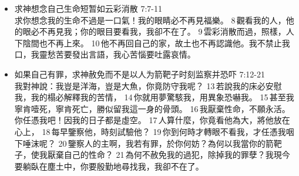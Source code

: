 \begin{itemize}
\begin{itemize}
\item 求神想念自己生命短暂如云彩消散 7:7-11\\
求你想念我的生命不過是一口氣！我的眼睛必不再見福樂。 8 觀看我的人，他的眼必不再見我；你的眼目要看我，我卻不在了。 9 雲彩消散而過，照樣，人下陰間也不再上來。 10 他不再回自己的家，故土也不再認識他。我不禁止我口，我靈愁苦要發出言語，我心苦惱要吐露哀情。
\item 如果自己有罪，求神赦免而不是以人为箭靶子时刻监察并恐吓 7:12-21\\
我對神說：我豈是洋海，豈是大魚，你竟防守我呢？ 13 若說我的床必安慰我，我的榻必解釋我的苦情， 14 你就用夢驚駭我，用異象恐嚇我。 15 甚至我寧肯噎死，寧肯死亡，勝似留我這一身的骨頭。 16 我厭棄性命，不願永活。你任憑我吧！因我的日子都是虛空。 17 人算什麼，你竟看他為大，將他放在心上， 18 每早鑒察他，時刻試驗他？ 19 你到何時才轉眼不看我，才任憑我咽下唾沫呢？ 20 鑒察人的主啊，我若有罪，於你何妨？為何以我當你的箭靶子，使我厭棄自己的性命？ 21 為何不赦免我的過犯，除掉我的罪孽？我現今要躺臥在塵土中，你要殷勤地尋找我，我卻不在了。
\end{itemize}
\end{itemize}


